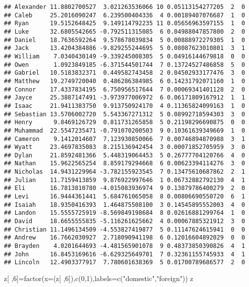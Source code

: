 \documentclass[
]{article}
\newenvironment{Shaded}{\begin{snugshade}}{\end{snugshade}}
\newcommand{\AttributeTok}[1]{\textcolor[rgb]{0.77,0.63,0.00}{#1}}
\newcommand{\DecValTok}[1]{\textcolor[rgb]{0.00,0.00,0.81}{#1}}
\newcommand{\FunctionTok}[1]{\textcolor[rgb]{0.00,0.00,0.00}{#1}}
\newcommand{\NormalTok}[1]{#1}
\newcommand{\OtherTok}[1]{\textcolor[rgb]{0.56,0.35,0.01}{#1}}
\newcommand{\StringTok}[1]{\textcolor[rgb]{0.31,0.60,0.02}{#1}}
\begin{document}
\begin{verbatim}
## Alexander 11.8802700527  3.021263536066 10 0.05113154277205  2  0
## Caleb     25.2016090247  6.239500404336  4 0.00189407076687  1  0
## Ryan      19.5152648425  9.149114792235 11 0.05656963597155  1  0
## Luke      32.6805542665 -0.792511315085  6 0.04988047857800  2  0
## Daniel    18.7636592264  9.578678039834  5 0.00888972279305  1  0
## Jack      13.4204384886 -9.829255244695  5 0.08087623010801  3  1
## William    7.0340430149 -9.339245008305  5 0.04916144679818  0  0
## Owen       1.0923849185 -6.371544501744  7 0.13724527486858  5  0
## Gabriel   10.5183832371  0.449582743458  2 0.04502933177476  3  0
## Matthew   19.2749720040  0.486286384985  6 0.14231792071160  1  0
## Connor    17.4337834195  6.750956517644  7 0.00069341401128  2  0
## Jayce     25.3887147491 -3.973977006972  6 0.06171809167912  1  1
## Isaac     21.9411383750  9.913750924170  4 0.11365824099163  1  0
## Sebastian 13.5706002720  5.543367271312  5 0.08992718594303  3  0
## Henry      9.8469126729  0.811731265858  5 0.21198296690875  0  0
## Muhammad  22.5547235471 -0.791070200503  9 0.10361639349669  1  0
## Cameron    9.1412014607  7.123930850066  7 0.00746894870988  3  1
## Wyatt     23.4697835083  8.215136942454  3 0.00071852705959  3  0
## Dylan     21.8592481366  5.448319064453  5 0.26777704120766  4  0
## Nathan    15.9622565254  8.859179294668  6 0.00623394114276  3  0
## Nicholas  14.9431229964 -3.782155923545  7 0.13475610687862  2  1
## Julian    11.7159413859  9.876922997646  1 0.06732882792130  4  1
## Eli       16.7813810780 -4.015083936974  9 0.13879786400279  2  0
## Levi      16.9444361441  5.684761065058  8 0.00806690550720  6  1
## Isaiah    18.9350416393  1.464875508100  3 0.14545895552003  4  0
## Landon    15.5555725919 -8.569849198684  8 0.02616881299764  1  0
## David     18.6655555835 -5.116261625662  4 0.00067885321912  3  0
## Christian 11.1496134509 -4.553827419877  5 0.11147624615941  0  0
## Andrew    16.7662030927  2.718090941198  6 0.12016604892029  0  0
## Brayden    4.0201644693 -4.481565901078  9 0.48373850390826  4  1
## John      16.8453169616 -6.629325649701  7 0.32361155745933  4  1
## Lincoln   12.4903377917  7.780601638369  5 0.01700789686577  2  0
\end{verbatim}

\begin{Shaded}
\begin{Highlighting}[]
\NormalTok{z[ ,}\DecValTok{6}\NormalTok{]}\OtherTok{=}\FunctionTok{factor}\NormalTok{(}\AttributeTok{x=}\NormalTok{(z[ ,}\DecValTok{6}\NormalTok{]),}\FunctionTok{c}\NormalTok{(}\DecValTok{0}\NormalTok{,}\DecValTok{1}\NormalTok{),}\AttributeTok{labels=}\FunctionTok{c}\NormalTok{(}\StringTok{"domestic"}\NormalTok{,}\StringTok{"foreign"}\NormalTok{))}
\NormalTok{z}
\end{Highlighting}
\end{Shaded}
\end{document}
